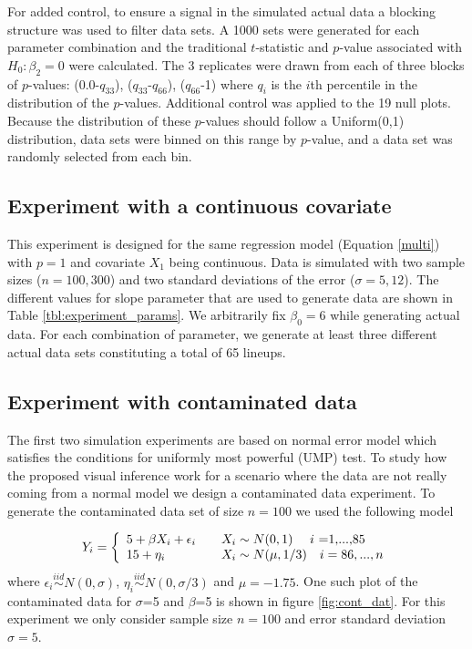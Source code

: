 \documentclass{article}
\begin{document}
For added control, to ensure a signal in the simulated actual data a blocking structure was used to filter data sets. A 1000 sets were generated for each parameter combination and the traditional $t$-statistic and $p$-value associated with $H_0: \beta_2=0$ were calculated. The 3 replicates were drawn from each of three blocks of $p$-values: (0.0-$q_{33}$), ($q_{33}$-$q_{66}$), ($q_{66}$-1) where $q_i$ is the $i$th percentile in the distribution of the $p$-values. Additional control was applied to the 19 null plots. Because the distribution of these $p$-values should follow a Uniform(0,1) distribution, data sets were binned on this range by $p$-value, and a data set was randomly selected from each bin.
  

\subsection{Experiment with a continuous covariate} 

This experiment is designed for the same regression model (Equation \eqref{multi}) with $p=1$ and covariate $X_1$ being continuous. Data is simulated with two sample sizes ($n=100, 300$) and two standard deviations of the error ($\sigma=5, 12$). The different values for slope parameter that are used to generate data are shown in Table \ref{tbl:experiment_params}. We arbitrarily fix $\beta_0 = 6$ while generating actual data. For each combination of parameter, we generate at least three different actual data sets constituting a total of 65 lineups. 


\subsection{Experiment with contaminated data}

The first two simulation experiments are based on normal error model which satisfies the conditions for uniformly most powerful (UMP) test. To study how the proposed visual inference work for a scenario where the data are not really coming from a normal model we design a contaminated data experiment. To generate the contaminated data set of size $n=100$ we used the following model


\[
  Y_i = \left\{
  \begin{array}{l l}
    5+\beta X_i + \epsilon_i  & \quad  X_i \sim N(0,1) \quad \text{ $i$ =1,...,85}\\
    15+ \eta_i & \quad X_i \sim N(\mu,1/3) \quad  i=86,...,n\\
  \end{array} \right.
\]
where $\epsilon_i \stackrel{iid}\sim N(0,\sigma)$, $\eta_i \stackrel{iid}\sim N(0,\sigma/3)$ and $\mu = -1.75$. One such plot of the contaminated data for $\sigma$=5 and $\beta$=5 is shown in figure \ref{fig:cont_dat}. For this experiment we only consider sample size $n=100$ and error standard deviation $\sigma=5$.
\end{document}
